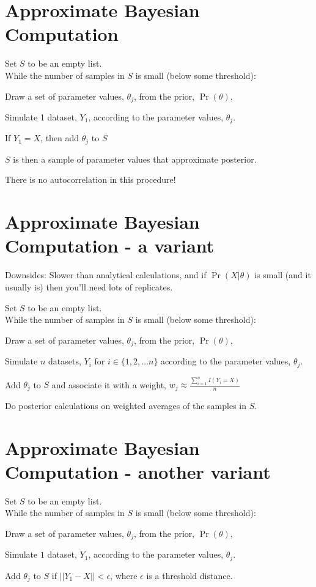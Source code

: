 \section*{Approximate Bayesian Computation}
Set $S$ to be an empty list.\\
While the number of samples in $S$ is small (below some threshold):
\begin{compactitem}
	\item Draw a set of parameter values, $\theta_j$, from the prior, $\Pr(\theta)$,
	\item Simulate 1 dataset, $Y_1$, according to the parameter values, $\theta_j$.
	\item If $Y_1 = X$, then add $\theta_j$ to $S$
\end{compactitem}

$S$ is then a sample of parameter values that approximate posterior.

There is no autocorrelation in this procedure!

\myNewSlide
\section*{Approximate Bayesian Computation - a variant}
Downsides: Slower than analytical calculations, and if $\Pr(X|\theta)$ is small (and it usually is) then you'll need lots of replicates.

{\color{grey} Set $S$ to be an empty list.\\
While the number of samples in $S$ is small (below some threshold):}
\begin{compactitem}
	{\color{grey}  \item  Draw a set of parameter values, $\theta_j$, from the prior, $\Pr(\theta)$,}
	\item Simulate $n$ datasets, $Y_i$ for $i \in \{1,2,\ldots n\}$ according to the parameter values, $\theta_j$.
	\item Add $\theta_j$ to $S$ and associate it with a weight, $w_j \approx \frac{\sum_{i=1}^nI(Y_i = X)}{n}$
\end{compactitem}

Do posterior calculations on weighted averages of the samples in $S$.


\myNewSlide
\section*{Approximate Bayesian Computation - another variant}
{\color{grey} Set $S$ to be an empty list.\\
While the number of samples in $S$ is small (below some threshold):}
\begin{compactitem}
	{\color{grey}  \item Draw a set of parameter values, $\theta_j$, from the prior, $\Pr(\theta)$,
	\item Simulate $1$ dataset, $Y_1$, according to the parameter values, $\theta_j$.}
	\item Add $\theta_j$ to $S$ if $||Y_1 - X|| < \epsilon$, where $\epsilon$ is a threshold distance.
\end{compactitem}

